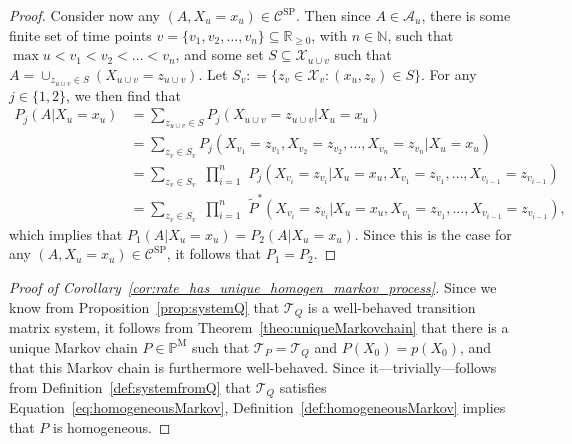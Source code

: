 \documentclass[10pt,a4paper]{paper}
\theoremstyle{definition}
\newcommand{\nats}{\mathbb{N}}
\newcommand{\reals}{\mathbb{R}}
\newcommand{\states}{\mathcal{X}}
\newcommand{\processes}{\mathbb{P}}
\newcommand{\mprocesses}{\processes^{\mathrm{M}}}
\newcommand{\coloneqq}{:\!=}
\begin{document}
\begin{proof}
Consider now any $(A,X_u=x_u)\in\mathcal{C}^\mathrm{SP}$. Then since $A\in\mathcal{A}_u$, there is some finite set of time points $v=\{v_1,v_2,\dots,v_n\}\subseteq\reals_{\geq0}$, with $n\in\nats$, such that $\max u<v_1<v_2<\dots<v_n$, and some set $S\subseteq\states_{u\cup v}$ such that $A=\cup_{z_{u\cup v}\in S}(X_{u\cup v}=z_{u\cup v})$. 
Let $S_v\coloneqq\{z_v\in\states_v\colon (x_u,z_v)\in S\}$.
For any $j\in\{1,2\}$, we then find that
\begin{align*}
P_j(A\vert X_u=x_u)
&=\sum_{z_{u\cup v}\in S}
P_j(X_{u\cup v}=z_{u\cup v}\vert X_u=x_u)\\
&=\sum_{z_{v}\in S_v}
P_j(X_{v_1}=z_{v_1}, X_{v_2}=z_{v_2}, \dots, X_{v_n}=z_{v_n}\vert X_u=x_u)\\[-1mm]
&=\sum_{z_{v}\in S_v}
\,\,
\prod_{i=1}^n
\,\,
P_j(X_{v_i}=z_{v_i}\vert X_u=x_u, X_{v_1}=z_{v_1}, \dots, X_{v_{i-1}}=z_{v_{i-1}})\\
&=\sum_{z_{v}\in S_v}
\,\,
\prod_{i=1}^n
\,\,
\tilde{P}^*(X_{v_i}=z_{v_i}\vert X_u=x_u, X_{v_1}=z_{v_1}, \dots, X_{v_{i-1}}=z_{v_{i-1}}),
\end{align*}
which implies that $P_1(A\vert X_u=x_u)=P_2(A\vert X_u=x_u)$. Since this is the case for any $(A,X_u=x_u)\in\mathcal{C}^\mathrm{SP}$, it follows that $P_1=P_2$.
\end{proof}

\begin{proof}[Proof of Corollary~\ref{cor:rate_has_unique_homogen_markov_process}]
Since we know from Proposition~\ref{prop:systemQ} that $\mathcal{T}_Q$ is a well-behaved transition matrix system, it follows from Theorem~\ref{theo:uniqueMarkovchain} that there is a unique Markov chain $P\in\mprocesses$ such that $\mathcal{T}_P=\mathcal{T}_Q$ and $P(X_0)=p(X_0)$, and that this Markov chain is furthermore well-behaved. Since it---trivially---follows from Definition~\ref{def:systemfromQ} that $\mathcal{T}_Q$ satisfies Equation~\eqref{eq:homogeneousMarkov}, Definition~\ref{def:homogeneousMarkov} implies that $P$ is homogeneous.
\end{proof}
\end{document}
